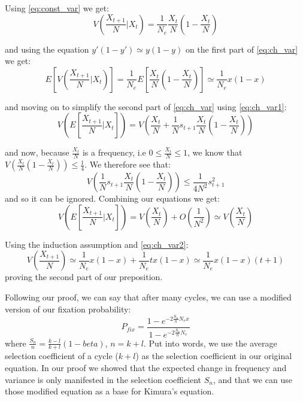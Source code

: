 \documentclass[11pt]{article}
\begin{document}
Using \cref{eq:const_var} we get:
\begin{equation}
V\left(\frac{X_{t+1}}{N} \bigg|X_t \right) = \frac{1}{N_e}\frac{X_t}{N}\left(1-\frac{X_t}{N} \right)
\end{equation}

and using the equation $y'(1-y') \simeq y(1-y)$ on the first part of \cref{eq:ch_var} we get:
\begin{equation}\label{eq:ch_var2}
E\left[V\left(\frac{X_{t+1}}{N} \bigg|X_t \right)\right] = \frac{1}{N_e}E\left[\frac{X_t}{N}\left(1- \frac{X_t}{N}\right) \right] \simeq \frac{1}{N_e} x(1-x)
\end{equation}

and moving on to simplify the second part of \cref{eq:ch_var} using \cref{eq:ch_var1}:
\begin{equation}
V\left(E\left[\frac{X_{t+1}}{N} \bigg|X_t \right]\right) = V\left(\frac{X_t}{N} + \frac{1}{N}s_{t+1}\frac{X_t}{N}\left(1-\frac{X_t}{N} \right) \right)
\end{equation}

and now, because $\frac{X_t}{N}$ is a frequency, i.e $0\leq\frac{X_t}{N}\leq1$, we know that $V\left(\frac{X_t}{N}\left(1-\frac{X_t}{N} \right) \right)\leq\frac{1}{4}$. We therefore see that:
\begin{equation}
V\left(\frac{1}{N}s_{t+1}\frac{X_t}{N}\left(1-\frac{X_t}{N} \right) \right)\leq \frac{1}{4N^2}s^2_{t+1}
\end{equation}
and so it can be ignored.
Combining our equations we get:
\begin{equation}
V\left(E\left[\frac{X_{t+1}}{N} \bigg|X_t \right]\right) = V\left(\frac{X_t}{N}\right) + O\left(\frac{1}{N^2}\right)\simeq V\left(\frac{X_t}{N}\right)
\end{equation}

Using the induction assumption and \cref{eq:ch_var2}:
\begin{equation}
V\left(\frac{X_{t+1}}{N}\right) \simeq \frac{1}{N_e}x(1-x) + \frac{1}{N_e}tx(1-x) \simeq \frac{1}{N_e}x(1-x)(t+1)
\end{equation}
proving the second part of our preposition.

Following our proof, we can say that after many cycles, we can use a modified version of our fixation probability:
\begin{equation}
P_{fix} = \frac{1-e^{-2 \frac{S_n}{n} N_e x}}{1-e^{-2 \frac{S_n}{n} N_e}}
\end{equation}
where $\frac{S_n}{n} = \frac{k-l}{k+l}(1-beta)$, $n=k+l$. Put into words, we use the average selection coefficient of a cycle ($k+l$) as the selection coefficient in our original equation.
In our proof we showed that the expected change in frequency and variance is only manifested in the selection coefficient $S_n$, and that we can use those modified equation as a base for Kimura's equation.
\end{document}
